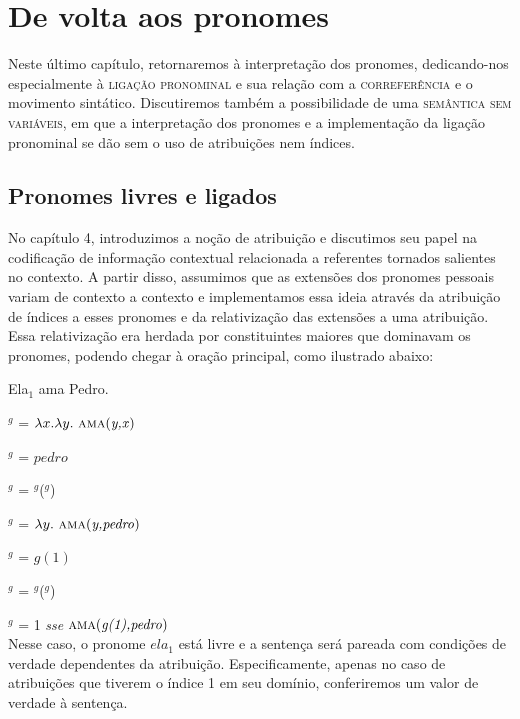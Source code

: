 
\chapter{De volta aos pronomes}

Neste último capítulo, retornaremos à interpretação dos pronomes, dedicando-nos especialmente à \textsc{ligação pronominal} e sua relação com a \textsc{correferência} e o movimento sintático. Discutiremos também a possibilidade de uma \textsc{semântica sem variáveis}, em que a interpretação dos pronomes e a implementação da ligação pronominal se dão sem o uso de atribuições nem índices. 

\section{Pronomes livres e ligados}

No capítulo 4, introduzimos a noção de atribuição e discutimos seu papel na codificação de informação contextual relacionada a referentes tornados salientes no contexto. A partir disso, assumimos que as extensões dos pronomes pessoais variam de contexto a contexto e implementamos essa ideia através da atribuição de índices a esses pronomes e da relativização das extensões a uma atribuição. Essa relativização era herdada por constituintes maiores que dominavam os pronomes, podendo chegar à oração principal, como ilustrado abaixo:

\begin{exe}
	\ex Ela$_{1}$ ama Pedro.
\end{exe}


\n{}$^{g}$ = $\lambda x.\lambda y.\ \predica{ama}{y,x}$

\n{}$^{g}$ = $pedro$

\n{}$^{g}$ = $^{g}$($^{g}$)

\n{}$^{g}$ = $\lambda y.\ \predica{ama}{y,pedro}$

\n{}$^{g}$ = $g(1)$

\n{}$^{g}$ = $^{g}$($^{g}$)

\n{}$^{g}$ = 1 \textit{sse} $\text{\textsc{ama}(\textit{g(1),pedro})}$ \\

\n Nesse caso, o pronome $ela_{1}$ está livre e a sentença será pareada com condições de verdade dependentes da atribuição. Especificamente, apenas no caso de atribuições que tiverem o índice 1 em seu domínio, conferiremos um valor de verdade à sentença.

